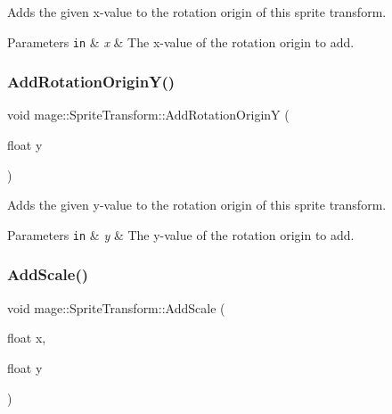 Adds the given x-\/value to the rotation origin of this sprite transform.


\begin{DoxyParams}[1]{Parameters}
\mbox{\tt in}  & {\em x} & The x-\/value of the rotation origin to add. \\
\hline
\end{DoxyParams}
\hypertarget{structmage_1_1_sprite_transform_a47808a3521d3c083b3fd0203fbd21b5c}{}\label{structmage_1_1_sprite_transform_a47808a3521d3c083b3fd0203fbd21b5c} 
\subsubsection{\texorpdfstring{Add\+Rotation\+Origin\+Y()}{AddRotationOriginY()}}
{\footnotesize\ttfamily void mage\+::\+Sprite\+Transform\+::\+Add\+Rotation\+OriginY (\begin{DoxyParamCaption}\item[{float}]{y }\end{DoxyParamCaption})}

Adds the given y-\/value to the rotation origin of this sprite transform.


\begin{DoxyParams}[1]{Parameters}
\mbox{\tt in}  & {\em y} & The y-\/value of the rotation origin to add. \\
\hline
\end{DoxyParams}
\hypertarget{structmage_1_1_sprite_transform_a4e260b9085f2609523979a7a0446c748}{}\label{structmage_1_1_sprite_transform_a4e260b9085f2609523979a7a0446c748} 
\subsubsection{\texorpdfstring{Add\+Scale()}{AddScale()}\hspace{0.1cm}{\footnotesize\ttfamily [1/3]}}
{\footnotesize\ttfamily void mage\+::\+Sprite\+Transform\+::\+Add\+Scale (\begin{DoxyParamCaption}\item[{float}]{x,  }\item[{float}]{y }\end{DoxyParamCaption})}

